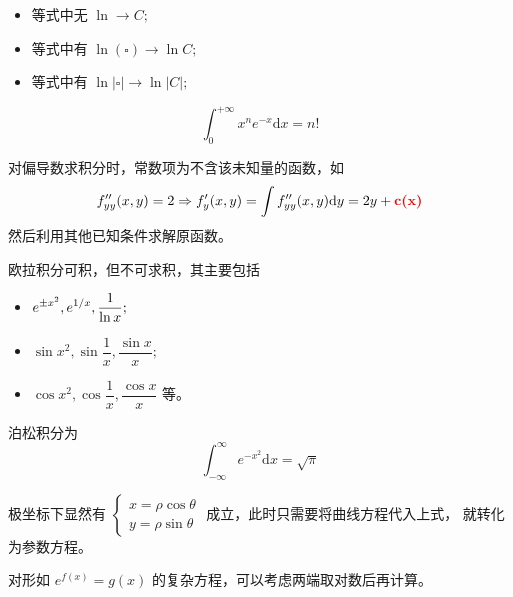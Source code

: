 \begin{Appendices}

\begin{itemize}
    \item 等式中无 $ \ln \rightarrow C;  $ 
    \item 等式中有 $ \ln (\square) \rightarrow \ln C; $ 
    \item 等式中有 $ \ln |\square| \rightarrow \ln |C|; $ 
\end{itemize}


$$
    \int_0^{+\infty} x^n e^{-x}\mathrm{d}x = n!
$$ 


对偏导数求积分时，常数项为不含该未知量的函数，如
\begin{equation*}
    \begin{aligned}
        f^{\prime\prime}_{yy}(x,y) = 2 \Rightarrow
        f'_y(x,y) = \int f^{\prime\prime}_{yy}(x,y) \mathrm{d}y
        = 2y + \textcolor{red}{\textbf{c(x)}}
    \end{aligned}
\end{equation*}
然后利用其他已知条件求解原函数。


欧拉积分可积，但不可求积，其主要包括
\begin{itemize}
    \item $ \displaystyle e^{\pm x^2},e^{1/x},\dfrac{1}{\ln x}; $ 
    \item $ \sin x^2,\sin \dfrac{1}{x}, \dfrac{\sin x}{x}; $ 
    \item $ \cos x^2,\cos \dfrac{1}{x}, \dfrac{\cos x}{x} $ 等。
\end{itemize}

泊松积分为
$$
    \int_{-\infty}^\infty e^{-x^2}\mathrm{d}x = \sqrt{\pi}    
$$ 


极坐标下显然有 $ \left\{\begin{matrix}
    x = \rho \cos \theta \\ y = \rho \sin \theta
\end{matrix}\right. $ 成立，此时只需要将曲线方程代入上式，
就转化为参数方程。


对形如 $ e^{f(x)} = g(x) $ 的复杂方程，可以考虑两端取对数后再计算。

\end{Appendices}